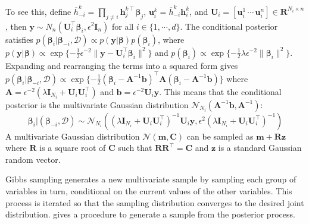 \documentclass{article}
\begin{document}
To see this, define $\overline{h}_{-i}^k = \prod_{j \ne i} \mathbf{h}_j^{k\intercal} \boldsymbol{\beta}_j$,
$\mathbf{u}_i^k = \overline{h}_{-i}^k \mathbf{h}_i^k$,
and $\mathbf{U}_i = [\mathbf{u}_i^1 \, \cdots \, \mathbf{u}_i^n] \in \mathbf{R}^{N_i \times n}$,
then $\mathbf{y} \sim N_n(\mathbf{U}_i^\intercal \boldsymbol{\beta}_i, \epsilon^2 \mathbf{I}_n)$
for all $i \in \{1, \cdots, d\}$.
The conditional posterior satisfies
$p(\boldsymbol{\beta}_i | \boldsymbol{\beta}_{-i}, \mathcal{D}) \propto
p(\mathbf{y} | \boldsymbol{\beta}) p(\boldsymbol{\beta}_i)$, where
$p(\mathbf{y} | \boldsymbol{\beta}) \propto \exp\{-\frac{1}{2} \epsilon^{-2}
  \|\mathbf{y} - \mathbf{U}_i^\intercal \boldsymbol{\beta}_i\|^2\}$ and
$p(\boldsymbol{\beta}_i) \propto \exp\{-\frac{1}{2} \lambda \epsilon^{-2} \|\boldsymbol{\beta}_i\|^2\}$.
Expanding and rearranging the terms into a squared form gives
$p(\boldsymbol{\beta}_i | \boldsymbol{\beta}_{-i}, \mathcal{D}) \propto
\exp\{-\frac{1}{2} (\boldsymbol{\beta}_i - \mathbf{A}^{-1} \mathbf{b})^\intercal \mathbf{A}
(\boldsymbol{\beta}_i - \mathbf{A}^{-1} \mathbf{b})\}$ where
$\mathbf{A} = \epsilon^{-2} (\lambda \mathbf{I}_{N_i} + \mathbf{U}_i \mathbf{U}_i^\intercal)$
and $\mathbf{b} = \epsilon^{-2} \mathbf{U}_i \mathbf{y}$.
This means that the conditional posterior is the multivariate Gaussian distribution
$\mathcal{N}_{N_i}(\mathbf{A}^{-1} \mathbf{b}, \mathbf{A}^{-1})$:
\begin{equation}
\boldsymbol{\beta}_i | (\boldsymbol{\beta}_{-i}, \mathcal{D})
\sim \mathcal{N}_{N_i}\left(
(\lambda \mathbf{I}_{N_i} + \mathbf{U}_i \mathbf{U}_i^\intercal)^{-1} \mathbf{U}_i \mathbf{y},
\epsilon^2 (\lambda \mathbf{I}_{N_i} + \mathbf{U}_i \mathbf{U}_i^\intercal)^{-1} \right)
\end{equation}
A multivariate Gaussian distribution $\mathcal{N}(\mathbf{m}, \mathbf{C})$
can be sampled as $\mathbf{m} + \mathbf{R} \mathbf{z}$
where $\mathbf{R}$ is a square root of $\mathbf{C}$
such that $\mathbf{R} \mathbf{R}^\intercal = \mathbf{C}$
and $\mathbf{z}$ is a standard Gaussian random vector.

Gibbs sampling generates a new multivariate sample by sampling each group of variables in turn,
conditional on the current values of the other variables.
This process is iterated so that the sampling distribution
converges to the desired joint distribution.
 gives a procedure to generate a sample from the posterior process.
\end{document}

